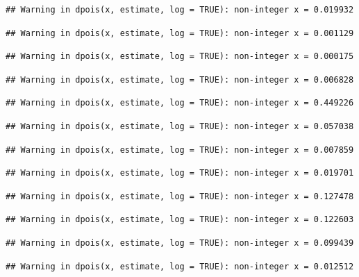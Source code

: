 \documentclass[]{article}
\begin{document}
\begin{verbatim}
## Warning in dpois(x, estimate, log = TRUE): non-integer x = 0.019932
\end{verbatim}

\begin{verbatim}
## Warning in dpois(x, estimate, log = TRUE): non-integer x = 0.001129
\end{verbatim}

\begin{verbatim}
## Warning in dpois(x, estimate, log = TRUE): non-integer x = 0.000175
\end{verbatim}

\begin{verbatim}
## Warning in dpois(x, estimate, log = TRUE): non-integer x = 0.006828
\end{verbatim}

\begin{verbatim}
## Warning in dpois(x, estimate, log = TRUE): non-integer x = 0.449226
\end{verbatim}

\begin{verbatim}
## Warning in dpois(x, estimate, log = TRUE): non-integer x = 0.057038
\end{verbatim}

\begin{verbatim}
## Warning in dpois(x, estimate, log = TRUE): non-integer x = 0.007859
\end{verbatim}

\begin{verbatim}
## Warning in dpois(x, estimate, log = TRUE): non-integer x = 0.019701
\end{verbatim}

\begin{verbatim}
## Warning in dpois(x, estimate, log = TRUE): non-integer x = 0.127478
\end{verbatim}

\begin{verbatim}
## Warning in dpois(x, estimate, log = TRUE): non-integer x = 0.122603
\end{verbatim}

\begin{verbatim}
## Warning in dpois(x, estimate, log = TRUE): non-integer x = 0.099439
\end{verbatim}

\begin{verbatim}
## Warning in dpois(x, estimate, log = TRUE): non-integer x = 0.012512
\end{verbatim}
\end{document}
